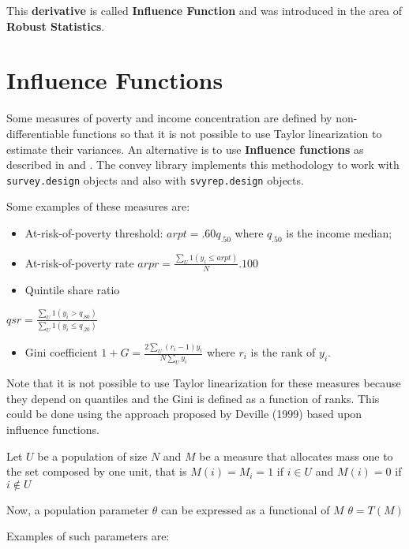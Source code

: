 \documentclass[]{book}
\providecommand{\tightlist}{%
  \setlength{\itemsep}{0pt}\setlength{\parskip}{0pt}}
\begin{document}
This \textbf{derivative} is called \textbf{Influence Function} and was
introduced in the area of \textbf{Robust Statistics}.

\section{Influence Functions}\label{influence-functions}

Some measures of poverty and income concentration are defined by
non-differentiable functions so that it is not possible to use Taylor
linearization to estimate their variances. An alternative is to use
\textbf{Influence functions} as described in \citep{deville1999} and
\citep{osier2009}. The convey library implements this methodology to
work with \texttt{survey.design} objects and also with
\texttt{svyrep.design} objects.

Some examples of these measures are:

\begin{itemize}
\item
  At-risk-of-poverty threshold: \(arpt=.60q_{.50}\) where \(q_{.50}\) is
  the income median;
\item
  At-risk-of-poverty rate \(arpr=\frac{\sum_U 1(y_i \leq arpt)}{N}.100\)
\item
  Quintile share ratio
\end{itemize}

\(qsr=\frac{\sum_U 1(y_i>q_{.80})}{\sum_U 1(y_i\leq q_{.20})}\)

\begin{itemize}
\tightlist
\item
  Gini coefficient \(1+G=\frac{2\sum_U (r_i-1)y_i}{N\sum_Uy_i}\) where
  \(r_i\) is the rank of \(y_i\).
\end{itemize}

Note that it is not possible to use Taylor linearization for these
measures because they depend on quantiles and the Gini is defined as a
function of ranks. This could be done using the approach proposed by
Deville (1999) based upon influence functions.

Let \(U\) be a population of size \(N\) and \(M\) be a measure that
allocates mass one to the set composed by one unit, that is
\(M(i)=M_i= 1\) if \(i\in U\) and \(M(i)=0\) if \(i\notin U\)

Now, a population parameter \(\theta\) can be expressed as a functional
of \(M\) \(\theta=T(M)\)

Examples of such parameters are:
\end{document}

